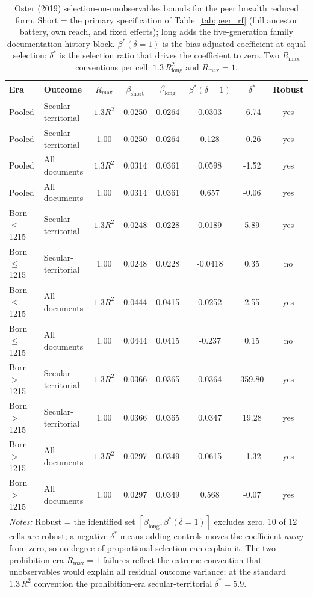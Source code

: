 \documentclass[12pt]{article}
\theoremstyle{definition}
\theoremstyle{remark}
\begin{document}
\begin{table}[t]
\centering
\caption{Oster (2019) selection-on-unobservables bounds for the peer breadth reduced form. Short = the primary specification of Table~\ref{tab:peer_rf} (full ancestor battery, own reach, and fixed effects); long adds the five-generation family documentation-history block. $\beta^*(\delta{=}1)$ is the bias-adjusted coefficient at equal selection; $\delta^*$ is the selection ratio that drives the coefficient to zero. Two $R_{\max}$ conventions per cell: $1.3\,R^2_{\text{long}}$ and $R_{\max}=1$.}
\label{tab:app_peer_oster}
{\small
\begin{tabular}{llcccccc}
\toprule
Era & Outcome & $R_{\max}$ & $\beta_{\text{short}}$ & $\beta_{\text{long}}$ & $\beta^*(\delta{=}1)$ & $\delta^*$ & Robust \\
\midrule
Pooled & Secular-territorial & $1.3R^2$ & 0.0250 & 0.0264 & 0.0303 & -6.74 & yes \\
Pooled & Secular-territorial & 1.00 & 0.0250 & 0.0264 & 0.128 & -0.26 & yes \\
Pooled & All documents & $1.3R^2$ & 0.0314 & 0.0361 & 0.0598 & -1.52 & yes \\
Pooled & All documents & 1.00 & 0.0314 & 0.0361 & 0.657 & -0.06 & yes \\
\addlinespace
Born $\leq$1215 & Secular-territorial & $1.3R^2$ & 0.0248 & 0.0228 & 0.0189 & 5.89 & yes \\
Born $\leq$1215 & Secular-territorial & 1.00 & 0.0248 & 0.0228 & -0.0418 & 0.35 & no \\
Born $\leq$1215 & All documents & $1.3R^2$ & 0.0444 & 0.0415 & 0.0252 & 2.55 & yes \\
Born $\leq$1215 & All documents & 1.00 & 0.0444 & 0.0415 & -0.237 & 0.15 & no \\
\addlinespace
Born $>$1215 & Secular-territorial & $1.3R^2$ & 0.0366 & 0.0365 & 0.0364 & 359.80 & yes \\
Born $>$1215 & Secular-territorial & 1.00 & 0.0366 & 0.0365 & 0.0347 & 19.28 & yes \\
Born $>$1215 & All documents & $1.3R^2$ & 0.0297 & 0.0349 & 0.0615 & -1.32 & yes \\
Born $>$1215 & All documents & 1.00 & 0.0297 & 0.0349 & 0.568 & -0.07 & yes \\
\midrule
\multicolumn{8}{p{0.9\textwidth}}{\footnotesize \textit{Notes:} Robust = the identified set $[\beta_{\text{long}}, \beta^*(\delta{=}1)]$ excludes zero. 10 of 12 cells are robust; a negative $\delta^*$ means adding controls moves the coefficient \emph{away} from zero, so no degree of proportional selection can explain it. The two prohibition-era $R_{\max}=1$ failures reflect the extreme convention that unobservables would explain all residual outcome variance; at the standard $1.3\,R^2$ convention the prohibition-era secular-territorial $\delta^*=5.9$.} \\
\bottomrule
\end{tabular}
}
\end{table}
\end{document}
